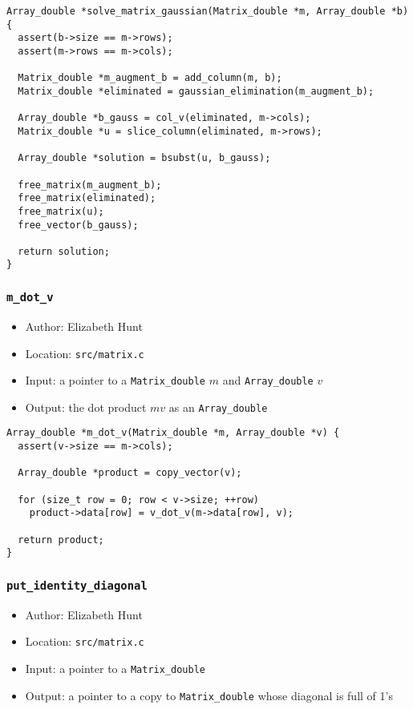 \documentclass[11pt]{article}
\begin{document}
\begin{verbatim}
Array_double *solve_matrix_gaussian(Matrix_double *m, Array_double *b) {
  assert(b->size == m->rows);
  assert(m->rows == m->cols);

  Matrix_double *m_augment_b = add_column(m, b);
  Matrix_double *eliminated = gaussian_elimination(m_augment_b);

  Array_double *b_gauss = col_v(eliminated, m->cols);
  Matrix_double *u = slice_column(eliminated, m->rows);

  Array_double *solution = bsubst(u, b_gauss);

  free_matrix(m_augment_b);
  free_matrix(eliminated);
  free_matrix(u);
  free_vector(b_gauss);

  return solution;
}
\end{verbatim}


\subsubsection{\texttt{m\_dot\_v}}
\label{sec:org304f5e5}
\begin{itemize}
\item Author: Elizabeth Hunt
\item Location: \texttt{src/matrix.c}
\item Input: a pointer to a \texttt{Matrix\_double} \(m\) and \texttt{Array\_double} \(v\)
\item Output: the dot product \(mv\) as an \texttt{Array\_double}
\end{itemize}

\begin{verbatim}
Array_double *m_dot_v(Matrix_double *m, Array_double *v) {
  assert(v->size == m->cols);

  Array_double *product = copy_vector(v);

  for (size_t row = 0; row < v->size; ++row)
    product->data[row] = v_dot_v(m->data[row], v);

  return product;
}
\end{verbatim}

\subsubsection{\texttt{put\_identity\_diagonal}}
\label{sec:orga145f39}
\begin{itemize}
\item Author: Elizabeth Hunt
\item Location: \texttt{src/matrix.c}
\item Input: a pointer to a \texttt{Matrix\_double}
\item Output: a pointer to a copy to \texttt{Matrix\_double} whose diagonal is full of 1's
\end{itemize}
\end{document}
